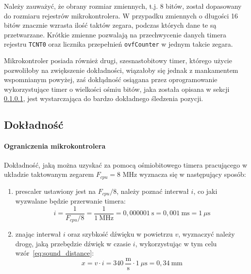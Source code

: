 Należy zauważyć, że obrany rozmiar zmiennych, t.j. 8 bitów, został dopasowany do rozmiaru rejestrów mikrokontrolera. W przypadku zmiennych o długości 16 bitów znacznie wzrasta ilość taktów zegara, podczas których dane te są przetwarzane. Krótkie zmienne pozwalają na przechwycenie danych timera \ppauza rejestru \texttt{TCNT0} oraz licznika przepełnień \texttt{ovfCounter} \ppauza w jednym takcie zegara.

Mikrokontroler posiada również drugi, szesnastobitowy timer, którego użycie pozwoliłoby na zwiększenie dokładności, wiązałoby się jednak z mankamentem wspomnianym powyżej, zaś dokłądność osiągana przez oprogramowanie wykorzystujące timer o wielkości ośmiu bitów, jaka została opisana w sekcji \ref{section:microcontroller_limit}, jest wystarczająca do bardzo dokładnego śledzenia pozycji.

\subsection{Dokładność}\label{section:precision}
\paragraph{Ograniczenia mikrokontrolera}
\label{section:microcontroller_limit}

Dokładność, jaką można uzyskać za pomocą ośmiobitowego timera pracującego w układzie taktowanym zegarem $F_{cpu} = 8$ MHz wyznacza się w następujący sposób:
\begin{enumerate}
 \item {}prescaler ustawiony jest na $F_{cpu}/8$, należy poznać interwał $i$, co jaki wyzwalane będzie przerwanie timera:
    \begin{equation}
      i = \frac{1}{F_{cpu}/8} = \frac{1}{1~\textrm{MHz}} = 0,000001~\textrm{s} = 0,001~\textrm{ms} = 1~\mu\textrm{s}
      \label{eq:sampling_frequency}
    \end{equation}

 \item znając interwał $i$ oraz szybkość dźwięku w powietrzu $v$, wyznaczyć należy drogę, jaką przebędzie dźwięk w czasie $i$, wykorzystując w tym celu wzór~\ref{eq:sound_distance}:
    \begin{equation}
      x = v \cdot i = 340~\frac{\textrm{m}}{\textrm{s}} \cdot 1~\mu\textrm{s} = 0,34~\textrm{mm}
      \label{eq:microcontroller_limit}
    \end{equation}
\end{enumerate}

